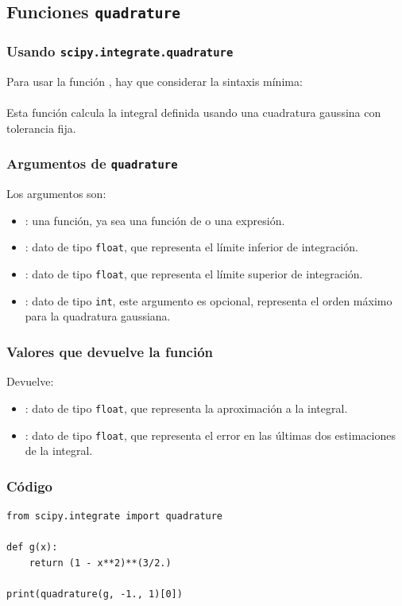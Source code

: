 \subsection{Funciones \texttt{quadrature}}
\begin{frame}[fragile]
\frametitle{Usando \texttt{scipy.integrate.quadrature}}
Para usar la función , hay que considerar la sintaxis mínima:
\\
\bigskip
{}
\\
\bigskip
\pause
Esta función calcula la integral definida usando una cuadratura gaussina con tolerancia fija.
\end{frame}
\begin{frame}
\frametitle{Argumentos de \texttt{quadrature}}
Los argumentos son:
\begin{itemize}
\item {} : una función, ya sea una función de \python{} o una expresión.
\item {} : dato de tipo \texttt{float}, que representa el límite inferior de integración.
\item {} : dato de tipo \texttt{float}, que representa el límite superior de integración.
\item {} : dato de tipo \texttt{int}, este argumento es opcional, representa el orden máximo para la quadratura gaussiana.
\end{itemize}
\end{frame}
\begin{frame}
\frametitle{Valores que devuelve la función}
Devuelve:
\begin{itemize}
\item {} : dato de tipo \texttt{float}, que representa la aproximación a la integral.
\item {} : dato de tipo \texttt{float}, que representa el error en las últimas dos estimaciones de la integral.
\end{itemize}
\end{frame}
\begin{frame}[fragile]
\frametitle{Código}
\begin{lstlisting}[caption=Código para cuadratura gaussiana, style=FormattedNumber, basicstyle=\linespread{1.1}\ttfamily=\small, columns=fullflexible]
from scipy.integrate import quadrature

def g(x):
    return (1 - x**2)**(3/2.)

print(quadrature(g, -1., 1)[0])
\end{lstlisting}
\end{frame}
